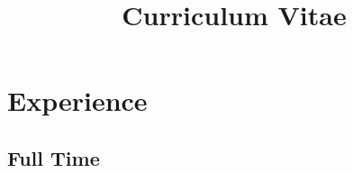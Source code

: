 \documentclass[11pt,a4paper,sans]{moderncv}
\title{Curriculum Vitae}
\begin{document}
	
\makecvtitle


\section{Experience}
\subsection{Full Time}
\end{document}
